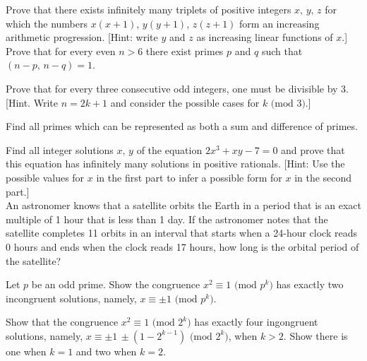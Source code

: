\documentclass[a4paper,11pt]{article}
\theoremstyle{mythm}
\theoremstyle{mydef}
\renewcommand{\pmod}[1]{\text{ (mod $#1$)}}
\begin{document}
 Prove that there exists infinitely many triplets of
positive integers $x,\,y,\,z$ for which the numbers $x(x+1)$, $y(y+1)$, $z(z+1)$
form an increasing arithmetic progression. [Hint: write $y$ and $z$ as
increasing linear functions of $x$.] \\

 Prove that for every even $n>6$ there exist primes
$p$ and $q$ such that $(n-p,\,n-q)=1$. \\

\begin{enumerate*}[{\bf (a)}]
\item Prove that for every three consecutive odd integers, one must be divisible
  by 3. [Hint. Write $n=2k+1$ and consider the possible cases for $k \pmod{3}$.]
\item Find all primes which can be represented as both a sum and difference of
  primes. \\
\end{enumerate*}

 Find all integer solutions $x,\,y$ of the equation
$2x^3+xy-7=0$ and prove that this equation has infinitely many solutions in
positive rationals. [Hint: Use the possible values for $x$ in the first part to
infer a possible form for $x$ in the second part.] \\

 An astronomer knows that a satellite orbits the
Earth in a period that is an exact multiple of 1 hour that is less than 1 day.
If the astronomer notes that the satellite completes 11 orbits in an interval
that starts when a 24-hour clock reads 0 hours and ends when the clock reads 17
hours, how long is the orbital period of the satellite? \\

\begin{enumerate*}[{\bf (a)}]
\item Let $p$ be an odd prime. Show the congruence $x^2 \equiv 1\pmod{p^k}$ has
  exactly two incongruent solutions, namely, $x \equiv \pm1 \pmod{p^k}$.
\item Show that the congruence $x^2 \equiv 1 \pmod{2^k}$ has exactly four
  ingongruent solutions, namely, $x \equiv \pm1\,\pm(1-2^{k-1}) \pmod{2^k}$,
  when $k>2$. Show there is one when $k=1$ and two when $k=2$.
\end{enumerate*}
\end{document}
